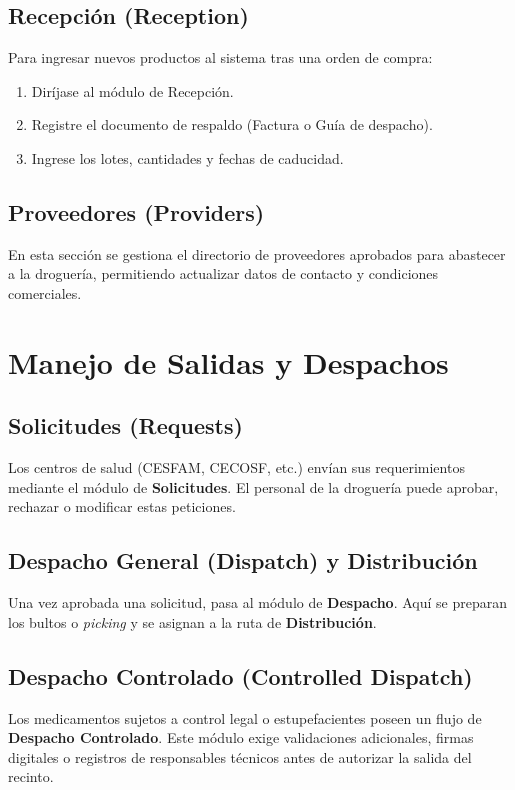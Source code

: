\documentclass[a4paper, 12pt]{article}
\begin{document}
\subsection{Recepción (Reception)}
Para ingresar nuevos productos al sistema tras una orden de compra:
\begin{enumerate}
    \item Diríjase al módulo de Recepción.
    \item Registre el documento de respaldo (Factura o Guía de despacho).
    \item Ingrese los lotes, cantidades y fechas de caducidad.
\end{enumerate}

\subsection{Proveedores (Providers)}
En esta sección se gestiona el directorio de proveedores aprobados para abastecer a la droguería, permitiendo actualizar datos de contacto y condiciones comerciales.

\section{Manejo de Salidas y Despachos}

\subsection{Solicitudes (Requests)}
Los centros de salud (CESFAM, CECOSF, etc.) envían sus requerimientos mediante el módulo de \textbf{Solicitudes}. El personal de la droguería puede aprobar, rechazar o modificar estas peticiones.

\subsection{Despacho General (Dispatch) y Distribución}
Una vez aprobada una solicitud, pasa al módulo de \textbf{Despacho}. Aquí se preparan los bultos o \textit{picking} y se asignan a la ruta de \textbf{Distribución}.

\subsection{Despacho Controlado (Controlled Dispatch)}
Los medicamentos sujetos a control legal o estupefacientes poseen un flujo de \textbf{Despacho Controlado}. Este módulo exige validaciones adicionales, firmas digitales o registros de responsables técnicos antes de autorizar la salida del recinto.
\end{document}
